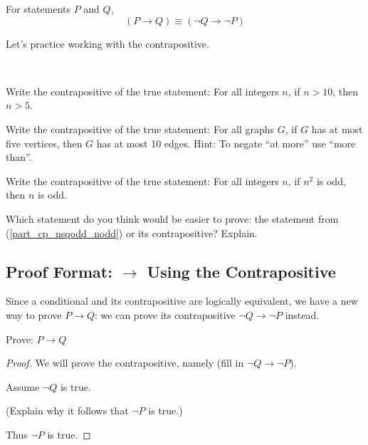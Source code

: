 \begin{thm}
\label{thm_cp}
    For statements $P$ and $Q$, 
        $$(P \to Q) \equiv (\neg Q \to \neg P)$$
\end{thm}

Let's practice working with the contrapositive.

\begin{act}[Contrapositive]
\label{act_cp}
~  
    \begin{actpart}    
        \item Write the contrapositive of the true statement: For all integers $n$, if $n>10$, then $n>5$.
        \item Write the contrapositive of the true statement: For all graphs $G$, if $G$ has at most five vertices, then $G$ has at most 10 edges. Hint: To negate ``at more'' use ``more than''.
        \item \label{part_cp_nsqodd_nodd} Write the contrapositive of the true statement: For all integers $n$, if $n^2$ is odd, then $n$ is odd.
        \item \label{part_cp_easier} Which statement do you think would be easier to prove:  the statement from (\ref{part_cp_nsqodd_nodd}) or its contrapositive? Explain.        
        \end{actpart}
\end{act}

\newcommand{\subpffcp}{Proof Format: $\to$ Using the Contrapositive}
\subsection{\subpffcp}
\label{sub_pff_cp}

Since a conditional and its contrapositive are logically equivalent, we have a new way to prove $P \to Q$: we can prove its contrapositive $\neg Q \to \neg P$ instead.  

\begin{pff}
\label{pff_if_then_cp}
    Prove: $P \to Q$
    \begin{proof}
    We will prove the contrapositive, namely (fill in $\neg Q \to \neg P$).  
    
    Assume $\neg Q$ is true. 
    
    (Explain why it follows that $\neg P$ is true.)

    Thus $\neg P$ is true.
    \end{proof}
\end{pff}

